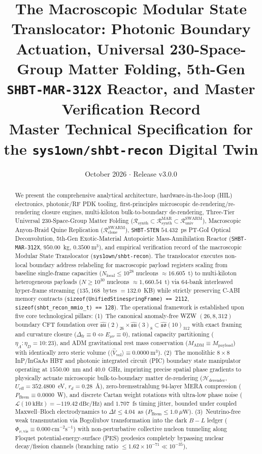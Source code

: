 \documentclass[11pt,onecolumn]{article}
\title{\textbf{The Macroscopic Modular State Translocator: Photonic Boundary Actuation, Universal 230-Space-Group Matter Folding, 5th-Gen \texttt{SHBT-MAR-312X} Reactor, and Master Verification Record}\\[0.3em]
\large Master Technical Specification for the \texttt{sys1own/shbt-recon} Digital Twin}
\author{}
\date{October 2026 \quad $\cdot$ \quad Release v3.0.0}
\begin{document}
\maketitle

\begin{abstract}
We present the comprehensive analytical architecture, hardware-in-the-loop (HIL) electronics, photonic/RF PDK tooling, first-principles microscopic de-rendering/re-rendering closure engines, multi-kiloton bulk-to-boundary de-rendering, Three-Tier Universal 230-Space-Group Matter Folding ($\mathcal{R}_{\text{synth}} \subset \mathcal{R}_{\text{synth}}^{\text{MAR}} \subset \mathcal{R}_{\text{univ}}^{\text{SWARM}}$), Macroscopic Anyon-Braid Quine Replication ($\mathcal{R}_{\text{clone}}^{\text{SWARM}}$), \texttt{SHBT-STEN} $54.432$~ps PT-GoI Optical Deconvolution, 5th-Gen Exotic-Material Autopoietic Mass-Annihilation Reactor (\texttt{SHBT-MAR-312X}, $950.00$~kg, $0.3500~\mathrm{m}^3$), and empirical verification record of the macroscopic Modular State Translocator (\texttt{sys1own/shbt-recon}). The translocator executes non-local boundary address relabeling for macroscopic payload registers scaling from baseline single-frame capacities ($N_{\text{local}} \le 10^{28}$ nucleons $\approx 16.605$~t) to multi-kiloton heterogeneous payloads ($N \ge 10^{30}$ nucleons $\approx 1{,}660.54$~t) via 64-bank interleaved hyper-frame streaming ($135{,}168$~bytes $= 132.0$~KB) while strictly preserving C-ABI memory contracts (\texttt{sizeof(UnifiedStinespringFrame) == 2112}, \texttt{sizeof(shbt\_recon\_mmio\_t) == 128}). The operational framework is established upon five core technological pillars: (1)~The canonical anomaly-free WZW $(26, 8, 312)$ boundary CFT foundation over $\widehat{\mathfrak{su}}(2)_{26} \times \widehat{\mathfrak{su}}(3)_8 \subset \widehat{\mathfrak{so}}(10)_{312}$ with exact framing and curvature closure ($\Delta_{\mathrm{fr}} \equiv 0 \iff E_{\mu\nu} \equiv 0$), rational capacity partitioning ($\eta_A : \eta_D = 10 : 23$), and ADM gravitational rest mass conservation ($M_{\mathrm{ADM}} \equiv M_{\mathrm{payload}}$) with identically zero steric volume ($\langle\hat{V}_{\mathrm{vol}}\rangle \equiv 0.0000~\mathrm{m}^3$). (2)~The monolithic $8\times 8$ InP/InGaAs HBT and photonic integrated circuit (PIC) boundary state manipulator operating at $1550.00$~nm and $40.0$~GHz, imprinting precise spatial phase gradients to physically actuate microscopic bulk-to-boundary matter de-rendering ($\mathcal{H}_{\mathrm{derender}}$, $U_{\mathrm{eff}} = 352.4800$~eV, $r_d = 0.28$~\AA), zero-bremsstrahlung 94-layer MERA compression ($P_{\mathrm{Brem}} \equiv 0.0000$~W), and discrete Cartan weight rotations with ultra-low phase noise ($\mathcal{L}(10~\mathrm{kHz}) = -119.42~\mathrm{dBc/Hz}$) and $1.707$~fs timing jitter, bounded under coupled Maxwell--Bloch electrodynamics to $\Delta t \le 4.04$~as ($P_{\mathrm{Brem}} \le 1.0~\mu\mathrm{W}$). (3)~Neutrino-free weak transmutation via Bogoliubov transformation into the dark $B-L$ ledger ($\Phi_{\nu,\mathrm{vis}} \equiv 0.000~\mathrm{cm}^{-2}\mathrm{s}^{-1}$) with non-perturbative collective nucleon tunneling along Floquet potential-energy-surface (PES) geodesics completely bypassing nuclear decay/fission channels (branching ratio $\le 1.62\times 10^{-71} \ll 10^{-35}$), 
\end{abstract}
\end{document}
